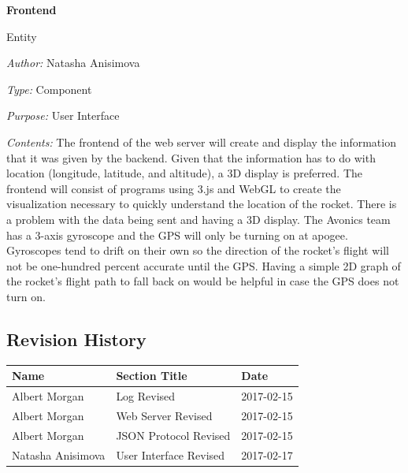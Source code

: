 \documentclass[10pt,draftclsnofoot,onecolumn]{IEEEtran}
\newcommand{\newentity}[5]{

	\noindent\textbf{#2}
	
	\noindent Entity
	
	\noindent\textit{Author:} {#1}
		
	\noindent\textit{Type:} {#3}
	
	\noindent\textit{Purpose:} {#4}

	\noindent\textit{Contents:} {#5}
	\vspace{.5cm}

}
\begin{document}
	\newentity
{Natasha Anisimova}
{Frontend}
{Component}
{User Interface}
{
	The frontend of the web server will create and display the information that it was given by the backend. Given
	that the information has to do with location
	(longitude, latitude, and altitude), a 3D display is preferred. The
	frontend will consist of programs using 3.js and WebGL to create the visualization necessary to quickly understand the
	location of the rocket. There is a problem with the data being sent and having a 3D display. The Avonics team has
	a 3-axis gyroscope and the GPS will only be turning on at apogee. Gyroscopes tend to drift on their own so the direction
	of the rocket's flight will not be one-hundred percent accurate until the GPS. Having a simple 2D graph of the rocket's
	flight path to fall back on would be helpful in case the GPS does not turn on.
}
	

\subsection*{Revision History}
\vspace{0.5cm}
\begin{tabular}{l | l | l}
Name & Section Title & Date\\ \hline
Albert Morgan & Log Revised & 2017-02-15\\
Albert Morgan & Web Server Revised & 2017-02-15\\
Albert Morgan & JSON Protocol Revised & 2017-02-15\\
Natasha Anisimova & User Interface Revised & 2017-02-17\\
\end{tabular}

	\clearpage
	\newpage
\end{document}
